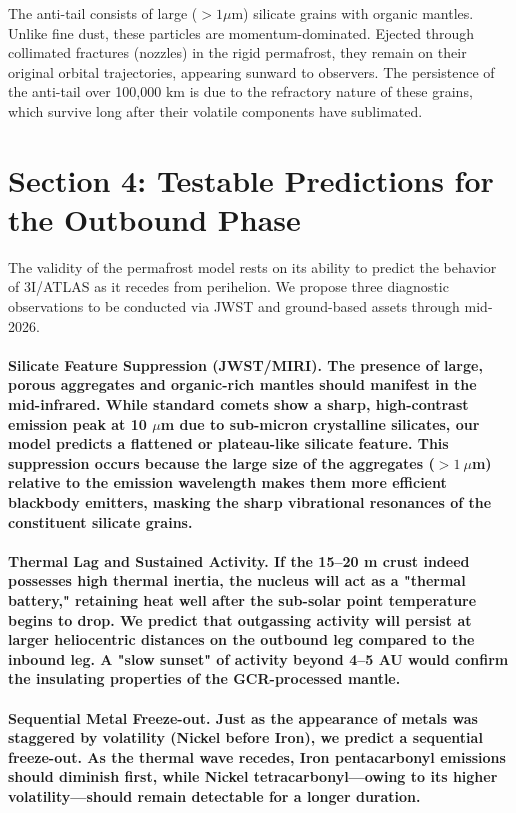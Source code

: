 \documentclass[reprint,aps,prd,noshowpacs]{revtex4-2}
\begin{document}
The anti-tail consists of large ($>1 \mu$m) silicate grains with organic mantles. Unlike fine dust, these particles are momentum-dominated. Ejected through collimated fractures (nozzles) in the rigid permafrost, they remain on their original orbital trajectories, appearing sunward to observers. The persistence of the anti-tail over 100,000 km is due to the refractory nature of these grains, which survive long after their volatile components have sublimated.

\section{Section 4: Testable Predictions for the Outbound Phase}

The validity of the permafrost model rests on its ability to predict the behavior of 3I/ATLAS as it recedes from perihelion. We propose three diagnostic observations to be conducted via JWST and ground-based assets through mid-2026.

\paragraph{\textbf{Silicate Feature Suppression (JWST/MIRI).} The presence of large, porous aggregates and organic-rich mantles should manifest in the mid-infrared. While standard comets show a sharp, high-contrast emission peak at 10 $\mu$m due to sub-micron crystalline silicates, our model predicts a flattened or plateau-like silicate feature. This suppression occurs because the large size of the aggregates ($>1~\mu$m) relative to the emission wavelength makes them more efficient blackbody emitters, masking the sharp vibrational resonances of the constituent silicate grains.}

\paragraph{\textbf{Thermal Lag and Sustained Activity.} If the 15--20 m crust indeed possesses high thermal inertia, the nucleus will act as a "thermal battery," retaining heat well after the sub-solar point temperature begins to drop. We predict that outgassing activity will persist at larger heliocentric distances on the outbound leg compared to the inbound leg. A "slow sunset" of activity beyond 4--5 AU would confirm the insulating properties of the GCR-processed mantle.}

\paragraph{\textbf{Sequential Metal Freeze-out.} Just as the appearance of metals was staggered by volatility (Nickel before Iron), we predict a sequential freeze-out. As the thermal wave recedes, Iron pentacarbonyl emissions should diminish first, while Nickel tetracarbonyl—owing to its higher volatility—should remain detectable for a longer duration.}
\end{document}
